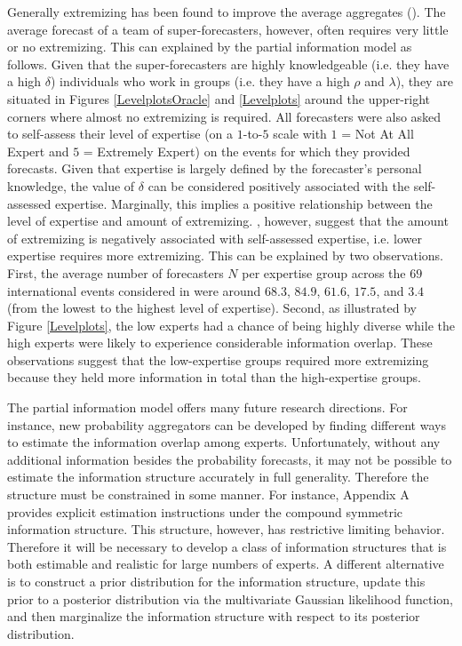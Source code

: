 \documentclass[11pt]{article}
\theoremstyle{definition}
\theoremstyle{definition}
\begin{document}
Generally extremizing has been found to improve the average aggregates (\citet{mellers2014psychological}). The average forecast of a team of super-forecasters, however, often requires very little or no extremizing. This can explained by the partial information model as follows. Given that the  super-forecasters are highly knowledgeable (i.e. they have a high $\delta$) individuals who work in groups (i.e. they have a high $\rho$ and $\lambda$), they are situated in Figures \ref{LevelplotsOracle} and \ref{Levelplots} around the upper-right corners where almost no extremizing is required. All forecasters were also asked to self-assess their level of expertise (on a $1$-to-$5$ scale with $1$ = Not At All Expert and $5$ = Extremely Expert) on the events for which they provided forecasts. Given that expertise is largely defined by the forecaster's personal knowledge, the value of $\delta$ can be considered positively associated with the self-assessed expertise. Marginally, this implies a positive relationship between the level of expertise and amount of extremizing. \citet{satopaa}, however, suggest that the amount of extremizing is negatively associated with self-assessed expertise, i.e. lower expertise requires more extremizing. This can be explained by two observations. First, the average number of forecasters $N$ per expertise group across the $69$ international events considered in \citet{satopaa} were around $68.3$, $84.9$, $61.6$, $17.5$, and $3.4$ (from the lowest to the highest level of expertise). Second, as illustrated by Figure \ref{Levelplots}, the low experts had a chance of being highly diverse while the high experts were likely to experience considerable information overlap. These observations suggest that the low-expertise groups required more extremizing because they held more information in total than the high-expertise groups.


The partial information model offers many future research directions. For instance, new probability aggregators can be developed by finding different ways  to estimate the information overlap among experts. Unfortunately, without any additional information besides the probability forecasts, it may not be possible to estimate the information structure accurately in full generality. Therefore the structure must be constrained in some manner. For instance, Appendix A provides explicit estimation instructions under the compound symmetric information structure. This structure, however, has restrictive limiting behavior. Therefore it will be necessary to develop a class of information structures that is  both estimable and realistic for large numbers of experts.  A different alternative is to construct a prior distribution for the information structure, update this prior to a posterior distribution via the multivariate Gaussian likelihood function, and then marginalize the information structure with respect to its posterior distribution.  
\end{document}
